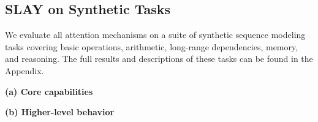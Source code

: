 \documentclass{article}
\begin{document}
\subsection{SLAY on Synthetic Tasks}
\label{subsec:synthetic-experiments}

We evaluate all attention mechanisms on a suite of synthetic sequence modeling tasks
covering basic operations, arithmetic, long-range dependencies, memory, and reasoning. The full results and descriptions of these tasks can be found in the Appendix.

\begin{table}[htbp]
\centering
\small
\caption{Average accuracy by task category. The name of different methods is the same as in Fig. \ref{fig:scaling}.}
\label{tab:summary}

\textbf{(a) Core capabilities}



\vspace{0.8em}

\textbf{(b) Higher-level behavior}


\end{table}
\end{document}
